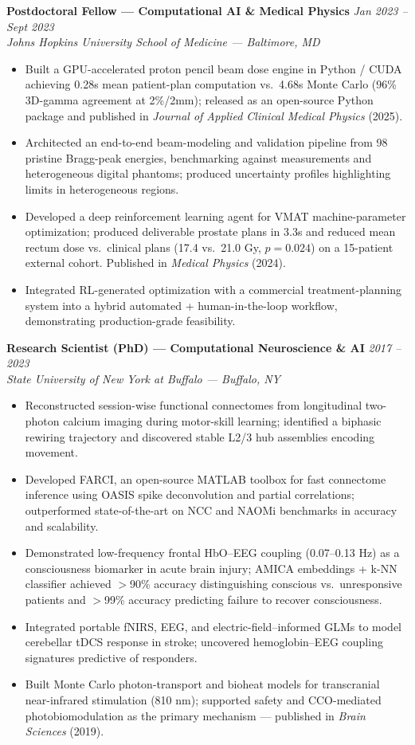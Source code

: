 \documentclass[11pt,letterpaper]{article}
\newcommand{\role}[4]{%
  \noindent\textbf{#1} \hfill \textit{#3}\\[1pt]
  \textit{#2} \hfill \textit{#4}\par\vspace{2pt}}
\begin{document}
\role{Postdoctoral Fellow --- Computational AI \& Medical Physics}{Johns Hopkins University School of Medicine --- Baltimore, MD}{Jan 2023 -- Sept 2023}{}
\begin{itemize}
  \item Built a GPU-accelerated proton pencil beam dose engine in Python / CUDA achieving 0.28s mean
        patient-plan computation vs.\ 4.68s Monte Carlo (96\% 3D-gamma agreement at 2\%/2mm); released
        as an open-source Python package and published in \textit{Journal of Applied Clinical Medical
        Physics} (2025).
  \item Architected an end-to-end beam-modeling and validation pipeline from 98 pristine Bragg-peak
        energies, benchmarking against measurements and heterogeneous digital phantoms; produced
        uncertainty profiles highlighting limits in heterogeneous regions.
  \item Developed a deep reinforcement learning agent for VMAT machine-parameter optimization;
        produced deliverable prostate plans in 3.3s and reduced mean rectum dose vs.\ clinical plans
        (17.4 vs.\ 21.0 Gy, $p=0.024$) on a 15-patient external cohort. Published in
        \textit{Medical Physics} (2024).
  \item Integrated RL-generated optimization with a commercial treatment-planning system into a
        hybrid automated + human-in-the-loop workflow, demonstrating production-grade feasibility.
\end{itemize}

\role{Research Scientist (PhD) --- Computational Neuroscience \& AI}{State University of New York at Buffalo --- Buffalo, NY}{2017 -- 2023}{}
\begin{itemize}
  \item Reconstructed session-wise functional connectomes from longitudinal two-photon calcium imaging
        during motor-skill learning; identified a biphasic rewiring trajectory and discovered stable
        L2/3 hub assemblies encoding movement.
  \item Developed FARCI, an open-source MATLAB toolbox for fast connectome inference using OASIS spike
        deconvolution and partial correlations; outperformed state-of-the-art on NCC and NAOMi
        benchmarks in accuracy and scalability.
  \item Demonstrated low-frequency frontal HbO--EEG coupling (0.07--0.13 Hz) as a consciousness
        biomarker in acute brain injury; AMICA embeddings + k-NN classifier achieved $>$90\% accuracy
        distinguishing conscious vs.\ unresponsive patients and $>$99\% accuracy predicting failure to
        recover consciousness.
  \item Integrated portable fNIRS, EEG, and electric-field--informed GLMs to model cerebellar tDCS
        response in stroke; uncovered hemoglobin--EEG coupling signatures predictive of responders.
  \item Built Monte Carlo photon-transport and bioheat models for transcranial near-infrared
        stimulation (810 nm); supported safety and CCO-mediated photobiomodulation as the primary
        mechanism --- published in \textit{Brain Sciences} (2019).
\end{itemize}
\end{document}
